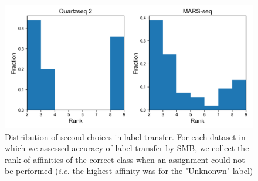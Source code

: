 \documentclass[11pt, titlepage, twoside]{article}
\begin{document}
\begin{figure}[htbp]
\centering
\includegraphics[keepaspectratio,width=\textwidth,height=0.75\textheight]{hist_label_second.png}
\caption[]{Distribution of second choices in label transfer. For each dataset in which we assessed accuracy of label transfer by SMB, we collect the rank of affinities of the correct class when an assignment could not be performed (\emph{i.e.} the highest affinity was for the "Unknonwn" label)  }\label{hist_label_second}
\end{figure}
\clearpage
\end{document}
